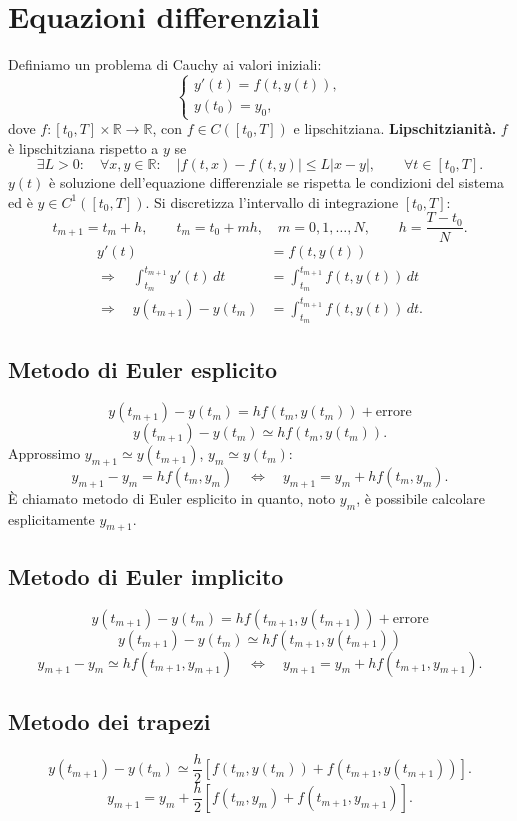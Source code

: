 \section*{Equazioni differenziali}
Definiamo un problema di Cauchy ai valori iniziali:
\[\begin{cases}y'(t)=f(t,y(t)),\\y(t_0)=y_0,\end{cases}\]
dove $f:[t_0,T]\times\mathbb R\to\mathbb R$, con $f\in C([t_0,T])$ e lipschitziana.
\textbf{Lipschitzianità.} $f$ è lipschitziana rispetto a $y$ se
\[\exists L>0:\quad\forall x,y\in\mathbb R:\quad|f(t,x)-f(t,y)|\le L|x-y|,\qquad\forall t\in[t_0,T].\]
$y(t)$ è soluzione dell'equazione differenziale se rispetta le condizioni del sistema ed è $y\in C^1([t_0,T])$.
Si discretizza l'intervallo di integrazione $[t_0,T]$:
\[t_{m+1}=t_m+h,\qquad t_m=t_0+mh,\quad m=0,1,\ldots,N,\qquad h=\frac{T-t_0}N.\]
\begin{align*}
y'(t)&=f(t,y(t))\\
\Longrightarrow\quad\int_{t_m}^{t_{m+1}}y'(t)\,dt&=\int_{t_m}^{t_{m+1}}f(t,y(t))\,dt\\
\Longrightarrow\quad y(t_{m+1})-y(t_m)&=\int_{t_m}^{t_{m+1}}f(t,y(t))\,dt.
\end{align*}
\subsection*{Metodo di Euler esplicito}
\[y(t_{m+1})-y(t_m)=hf(t_m,y(t_m))+\text{errore}\]
\[y(t_{m+1})-y(t_m)\simeq hf(t_m,y(t_m)).\]
Approssimo $y_{m+1}\simeq y(t_{m+1})$, $y_m\simeq y(t_m)$:
\[y_{m+1}-y_m=hf(t_m,y_m)\quad\Longleftrightarrow\quad
\boxed{y_{m+1}=y_m+hf(t_m,y_m)}.\]
È chiamato metodo di Euler esplicito in quanto, noto $y_m$, è possibile calcolare esplicitamente $y_{m+1}$.
\subsection*{Metodo di Euler implicito}
\[y(t_{m+1})-y(t_m)=hf(t_{m+1},y(t_{m+1}))+\text{errore}\]
\[y(t_{m+1})-y(t_m)\simeq hf(t_{m+1},y(t_{m+1}))\]
\[y_{m+1}-y_m\simeq hf(t_{m+1},y_{m+1})\quad\Longleftrightarrow\quad
\boxed{y_{m+1}=y_m+hf(t_{m+1},y_{m+1})}.\]
\subsection*{Metodo dei trapezi}
\[y(t_{m+1})-y(t_m)\simeq\frac h2[f(t_m,y(t_m))+f(t_{m+1},y(t_{m+1}))].\]
\[\boxed{y_{m+1}=y_m+\frac h2[f(t_m,y_m)+f(t_{m+1},y_{m+1})]}.\]
